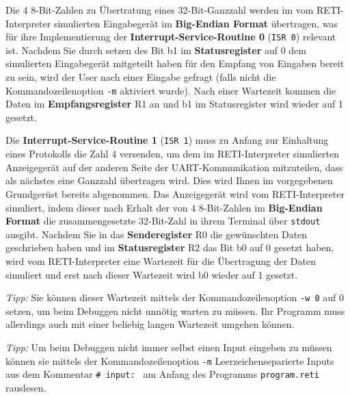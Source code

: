 \documentclass{article}
\begin{document}
{\color{green}
  Die 4 8-Bit-Zahlen zu Übertratung eines 32-Bit-Ganzzahl werden im vom RETI-Interpreter simulierten Eingabegerät im \textbf{Big-Endian Format} übertragen, was für ihre Implementierung der \textbf{Interrupt-Service-Routine 0} (\texttt{ISR 0}) relevant ist. Nachdem Sie durch setzen des Bit b1 im \textbf{Statusregister} auf 0 dem simulierten Eingabegerät mitgeteilt haben für den Empfang von Eingaben bereit zu sein, wird der User nach einer Eingabe gefragt (falls nicht die Kommandozeilenoption \texttt{-m} aktiviert wurde). Nach einer Wartezeit kommen die Daten im \textbf{Empfangsregister} R1 an und b1 im Statusregister wird wieder auf 1 gesetzt. 

  Die \textbf{Interrupt-Service-Routine 1} (\texttt{ISR 1}) muss zu Anfang zur Einhaltung eines Protokolls die Zahl 4 versenden, um dem im RETI-Interpreter simulierten Anzeigegerät auf der anderen Seite der UART-Kommunikation mitzuteilen, dass als nächstes eine Ganzzahl übertragen wird. Dies wird Ihnen im vorgegebenen Grundgerüst bereits abgenommen. Das Anzeigegerät wird vom RETI-Interpreter simuliert, indem dieser nach Erhalt der von 4 8-Bit-Zahlen im \textbf{Big-Endian Format} die zusammengesetzte 32-Bit-Zahl in ihrem Terminal über \verb|stdout| ausgibt. Nachdem Sie in das \textbf{Senderegister} R0 die gewünschten Daten geschrieben haben und im \textbf{Statusregister} R2 das Bit b0 auf 0 gesetzt haben, wird vom RETI-Interpreter eine Wartezeit für die Übertragung der Daten simuliert und erst nach dieser Wartezeit wird b0 wieder auf 1 gesetzt. 

  \textit{Tipp:} Sie können dieser Wartezeit mittels der Kommandozeilenoption \texttt{-w 0} auf 0 setzen, um beim Debuggen nicht unnötig warten zu müssen. Ihr Programm muss allerdings auch mit einer beliebig langen Wartezeit umgehen können.

  \textit{Tipp:} Um beim Debuggen nicht immer selbst einen Input eingeben zu müssen können sie mittels der Kommandozeilenoption \texttt{-m} Leerzeichenseparierte Inputs aus dem Kommentar \verb|# input: | am Anfang des Programms \verb|program.reti| rauslesen.


}
\end{document}
